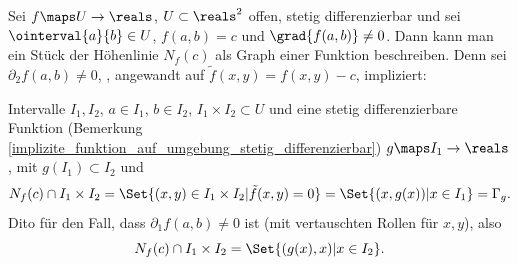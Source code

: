 \begin{folgerung}\label{satz_von_der_impliziten_funktion:hoehenlinie_folgerung}
  Sei \( f\maps U\to \reals \), \( U\subset \reals^2 \) offen, stetig differenzierbar und sei \( \ointerval{a}{b}\in U \), \( f(a,b)=c \) und \( \grad{f(a,b)}\neq 0 \). Dann kann man ein Stück der Höhenlinie \( N_f(c) \) als Graph einer Funktion beschreiben. Denn sei \( \partial_2 f(a,b)\neq 0 \), ,  angewandt auf \( \tilde{f}(x,y)=f(x,y)-c \), impliziert:

  \texists Intervalle \( I_1,I_2 \), \( a\in I_1 \), \( b\in I_2 \), \( I_1\times I_2\subset U \) und eine stetig differenzierbare Funktion (Bemerkung \ref{implizite_funktion_auf_umgebung_stetig_differenzierbar}) \( g\maps I_1\to \reals \), mit \( g(I_1)\subset I_2 \) und
  \begin{multline*}
    N_f(c)\cap I_1\times I_2=\Set{(x,y)\in I_1\times I_2|\tilde{f}(x,y)=0}=\Set{(x,g(x))|x\in I_1}=\Gamma_g.
  \end{multline*}
  Dito für den Fall, dass \( \partial_1 f(a,b)\neq 0 \) ist (mit vertauschten Rollen für \( x, y \)), also
  \begin{equation*}
    N_f(c)\cap I_1\times I_2=\Set{(g(x),x)|x\in I_2}.
  \end{equation*}
\end{folgerung}
